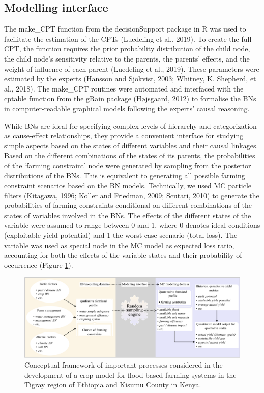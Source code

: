 \documentclass[]{elsarticle} %
\begin{document}
\hypertarget{ref35}{%
\subsection{Modelling interface}\label{ref35}}

The make\_CPT function from the decisionSupport package in R was used to facilitate the estimation of the CPTs (Luedeling et al., 2019). To create the full CPT, the function requires the prior probability distribution of the child node, the child node's sensitivity relative to the parents, the parents' effects, and the weight of influence of each parent (Luedeling et al., 2019). These parameters were estimated by the experts (Hansson and Sjökvist, 2003; Whitney, K. Shepherd, et al., 2018). The make\_CPT routines were automated and interfaced with the cptable function from the gRain package (Højsgaard, 2012) to formalise the BNs in computer-readable graphical models following the experts' causal reasoning.

While BNs are ideal for specifying complex levels of hierarchy and categorization as cause-effect relationships, they provide a convenient interface for studying simple aspects based on the states of different variables and their causal linkages. Based on the different combinations of the states of its parents, the probabilities of the `farming constraint' node were generated by sampling from the posterior distributions of the BNs. This is equivalent to generating all possible farming constraint scenarios based on the BN models. Technically, we used MC particle filters (Kitagawa, 1996; Koller and Friedman, 2009; Scutari, 2010) to generate the probabilities of farming constraints conditional on different combinations of the states of variables involved in the BNs. The effects of the different states of the variable were assumed to range between 0 and 1, where 0 denotes ideal conditions (exploitable yield potential) and 1 the worst-case scenario (total loss). The variable was used as special node in the MC model as expected loss ratio, accounting for both the effects of the variable states and their probability of occurrence (Figure \ref{fig:fig3}).

\begin{figure}[!h]

{\centering \includegraphics[width=1\linewidth,]{figures/conceptual-framework-1} 

}

\caption{Conceptual framework of important processes considered in the development of a crop model for flood-based farming systems in the Tigray region of Ethiopia and Kisumu County in Kenya.}\label{fig:fig3}
\end{figure}
\end{document}
